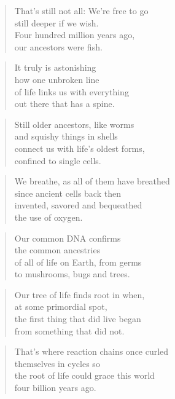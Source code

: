 \documentclass[10pt,a4paper]{article}
\begin{document}
\begin{multicols}{2}
\begin{verse}
That’s still not all: We’re free to go\\
still deeper if we wish.\\
Four hundred million years ago,\\
our ancestors were fish.
\end{verse}

\begin{verse}
It truly is astonishing\\
how one unbroken line\\
of life links us with everything\\
out there that has a spine.
\end{verse}

\begin{verse}
Still older ancestors, like worms\\
and squishy things in shells\\
connect us with life’s oldest forms,\\
confined to single cells.
\end{verse}

\begin{verse}
We breathe, as all of them have breathed\\
since ancient cells back then\\
invented, savored and bequeathed\\
the use of oxygen.
\end{verse}

\begin{verse}
Our common DNA confirms\\
the common ancestries\\
of all of life on Earth, from germs\\
to mushrooms, bugs and trees.
\end{verse}

\begin{verse}
Our tree of life finds root in when,\\
at some primordial spot,\\
the first thing that did live began\\
from something that did not.
\end{verse}

\begin{verse}
That’s where reaction chains once curled\\
themselves in cycles so\\
the root of life could grace this world\\
four billion years ago.
\end{verse}


\end{multicols}
\end{document}
